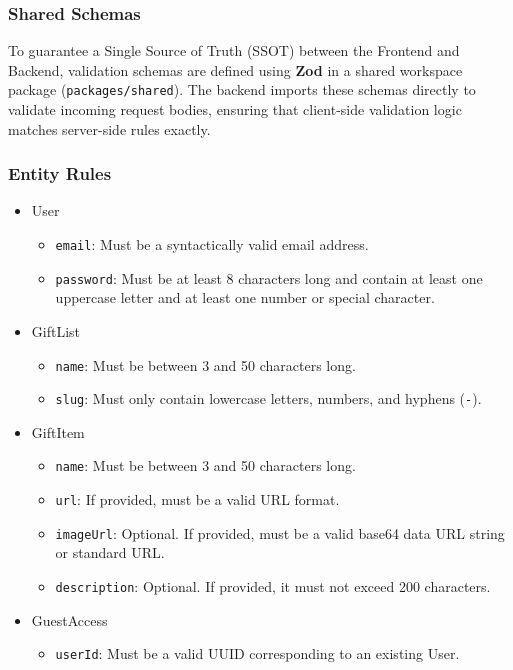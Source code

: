 \subsubsection{Shared Schemas}
To guarantee a Single Source of Truth (SSOT) between the Frontend and Backend, validation schemas are defined using \textbf{Zod} in a shared workspace package (\texttt{packages/shared}). The backend imports these schemas directly to validate incoming request bodies, ensuring that client-side validation logic matches server-side rules exactly.

\subsubsection{Entity Rules}
\begin{itemize}
    \item User
    \begin{itemize}
        \item \texttt{email}: Must be a syntactically valid email address.
        \item \texttt{password}: Must be at least 8 characters long and contain at least one uppercase letter and at least one number or special character.
    \end{itemize}
    \item GiftList
    \begin{itemize}
        \item \texttt{name}: Must be between 3 and 50 characters long.
        \item \texttt{slug}: Must only contain lowercase letters, numbers, and hyphens (\texttt{-}).
    \end{itemize}
    \item GiftItem
    \begin{itemize}
        \item \texttt{name}: Must be between 3 and 50 characters long.
        \item \texttt{url}: If provided, must be a valid URL format.
        \item \texttt{imageUrl}: Optional. If provided, must be a valid base64 data URL string or standard URL.
        \item \texttt{description}: Optional. If provided, it must not exceed 200 characters.
    \end{itemize}
    \item GuestAccess
    \begin{itemize}
        \item \texttt{userId}: Must be a valid UUID corresponding to an existing User.
    \end{itemize}
\end{itemize}

